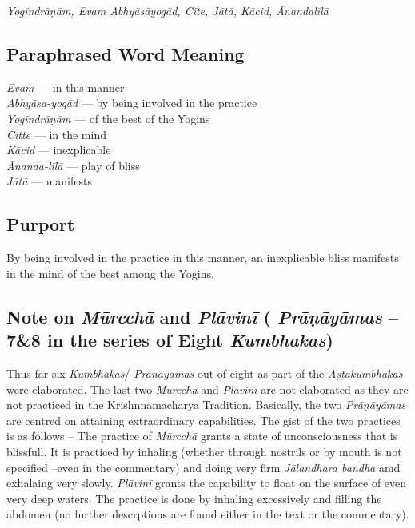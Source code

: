 \textit{Yogīndrāṇām, Evam Abhyāsāyogād, Cite, Jātā, Kācid, Ānandalīlā}

\subsection*{Paraphrased Word Meaning}


\begin{multicols}{2}
\textit{Evam} --- in this manner \\
\textit{Abhyāsa-yogād} ---  by being involved in the practice \\
\textit{Yogīndrāṇām} --- of the best of the Yogins \\
\textit{Citte}  --- in the mind \\
\textit{Kācid} --- inexplicable \\
\textit{Ānanda-līlā} --- play of bliss \\
\textit{Jātā} ---  manifests
\end{multicols}

\subsection*{Purport}


By being involved in the practice in this manner, an inexplicable bliss manifests in the mind of the best among the Yogins.

\subsection*{Note on  \textit{Mūrcchā} and  \textit{Plāvinī}   ( \textit{Prāṇāyāmas} – 7\&8 in the series of Eight \textit{Kumbhakas})}


Thus far six \textit{Kumbhakas}/ \textit{Prāṇāyāmas} out of eight as part of the  \textit{Aṣṭakumbhakas} were elaborated. The last two  \textit{Mūrcchā}  and  \textit{Plāvinī} are not elaborated as they are not practiced in the Krishnnamacharya Tradition. Basically, the two \textit{Prāṇāyāmas} are centred on attaining extraordinary capabilities.  The gist of the two practices is as follows – The practice of  \textit{Mūrcchā}  grants a state of unconsciousness that is blissfull. It is practiced by inhaling (whether through nostrils or by mouth is not specified –even in the commentary) and doing very firm  \textit{Jālandhara bandha} amd exhalaing very slowly.   \textit{Plāvinī} grants the capability to float on the surface of even very deep waters. The practice is done by inhaling excessively and filling  the abdomen (no further descrptions are found either in the text or the commentary). 
\newpage

